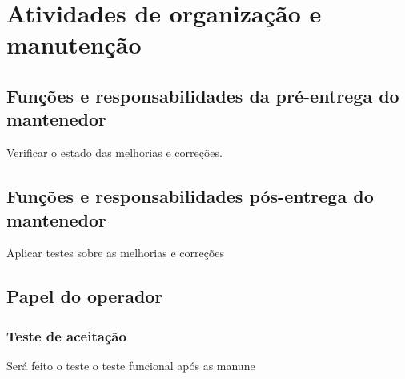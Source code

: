 \chapter{Atividades de organização e manutenção}

\section{Funções e responsabilidades da pré-entrega do mantenedor}
Verificar o estado das melhorias e correções. 

\section{Funções e responsabilidades pós-entrega do mantenedor}
Aplicar testes sobre as melhorias e correções

\section{Papel do operador}

\subsection{Teste de aceitação}
Será feito o teste o teste funcional após as manune
